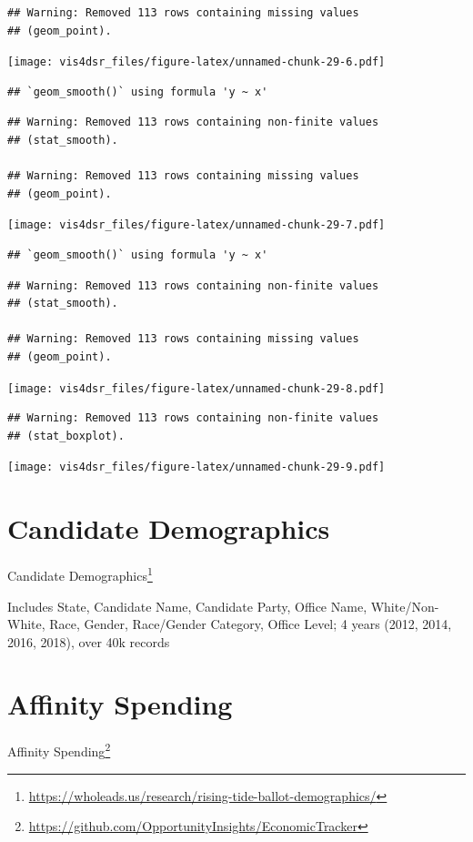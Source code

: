 \documentclass[
]{krantz}
\renewcommand{\href}[2]{#2\footnote{\url{#1}}}
\begin{document}
\begin{verbatim}
## Warning: Removed 113 rows containing missing values
## (geom_point).
\end{verbatim}

\texttt{[image: vis4dsr\_files/figure-latex/unnamed-chunk-29-6.pdf]}

\begin{verbatim}
## `geom_smooth()` using formula 'y ~ x'
\end{verbatim}

\begin{verbatim}
## Warning: Removed 113 rows containing non-finite values
## (stat_smooth).

## Warning: Removed 113 rows containing missing values
## (geom_point).
\end{verbatim}

\texttt{[image: vis4dsr\_files/figure-latex/unnamed-chunk-29-7.pdf]}

\begin{verbatim}
## `geom_smooth()` using formula 'y ~ x'
\end{verbatim}

\begin{verbatim}
## Warning: Removed 113 rows containing non-finite values
## (stat_smooth).

## Warning: Removed 113 rows containing missing values
## (geom_point).
\end{verbatim}

\texttt{[image: vis4dsr\_files/figure-latex/unnamed-chunk-29-8.pdf]}

\begin{verbatim}
## Warning: Removed 113 rows containing non-finite values
## (stat_boxplot).
\end{verbatim}

\texttt{[image: vis4dsr\_files/figure-latex/unnamed-chunk-29-9.pdf]}

\hypertarget{candidate-demographics}{%
\section*{Candidate Demographics}\label{candidate-demographics}}


\href{https://wholeads.us/research/rising-tide-ballot-demographics/}{Candidate Demographics}

Includes State, Candidate Name, Candidate Party, Office Name, White/Non-White, Race, Gender, Race/Gender Category, Office Level; 4 years (2012, 2014, 2016, 2018), over 40k records

\hypertarget{affinity-spending}{%
\section*{Affinity Spending}\label{affinity-spending}}


\href{https://github.com/OpportunityInsights/EconomicTracker}{Affinity Spending}

  

\backmatter
\printindex
\end{document}
